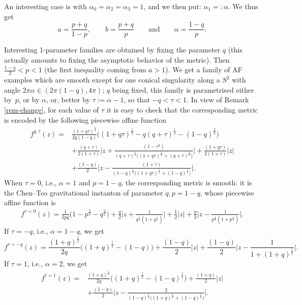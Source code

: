 \documentclass[pdftex]{sigma}
\numberwithin{equation}{section}
\begin{document}
 \begin{pc} \label{pc-AF2} An interesting case is with $\alpha _0 = \alpha_2 = \alpha _3 = 1$, and we then put: $\alpha _1 =: \alpha$. We thus get
 \[ a = \frac{p + q}{1 - p}, \qquad b = \frac{p + q}{p} \qquad \text{and}\qquad \alpha = \frac{1 - q}{p}. \]

 Interesting 1-parameter families are obtained by fixing the parameter $q$ (this actually amounts to fixing the asymptotic behavior of the metric). Then $\frac{1-q}2<p<1$ (the first inequality coming from $a>1$). We get a family of AF examples which are smooth except for one conical singularity along a $S^2$ with angle $2\pi\alpha\in(2\pi(1-q),4\pi)$; $q$ being fixed, this family is parametrised either by~$p$, or by $\alpha$, or, better by $\tau := \alpha - 1$, so that $- q < \tau < 1$. In view of Remark \ref{rem-change}, for each value of $\tau$ it is easy to check that the corresponding metric is encoded by the following piecewise affine function
 \begin{align*} f ^{q, \tau} (z) ={} & \frac{(1 + q \tau)^{\frac{1}{2}}}{2 q (1 - q)} \big((1 + q \tau)^{\frac{1}{2}} - q (q + \tau)^{\frac{1}{2}} - (1 - q) ^{\frac{3}{2}}\big) \\ & + \frac{(q + \tau)}{2 (1 + \tau)} \bigg|z + \frac{(1 - \tau ^2)}{(q + \tau) ^{\frac{1}{2}} \big((1 + q \tau) ^{\frac{1}{2}} + (q + \tau)^{\frac{1}{2}}\big)}\bigg| + \frac{(1 + q \tau)}{2 (1 + \tau)} |z| \\ & + \frac{(1 - q)}{2} \bigg\vert z - \frac{(1 + \tau)}{(1 - q) ^{\frac{1}{2}} \big((1 + q \tau)^{\frac{1}{2}} + (1 - q)^{\frac{1}{2}}\big)}\bigg\vert.
\end{align*}
 When $\tau = 0$, i.e., $\alpha = 1$ and $p = 1 - q$, the corresponding metric is smooth: it is the Chen--Teo gravitational instanton of parameter $q, p = 1 - q$, whose piecewise affine function is
 \begin{gather*} f ^{\tau = 0} (z) = \frac{1}{2 p q} \big(1 - p ^{\frac{3}{2}} - q ^{\frac{3}{2}}\big) + \frac{q}{2} \bigg|z + \frac{1}{q ^{\frac{1}{2}} (1 + q ^{\frac{1}{2}})}\bigg| + \frac{1}{2} |z| + \frac{p}{2} \bigg|z - \frac{1}{p ^{\frac{1}{2}} (1 + p ^{\frac{1}{2}})}\bigg|. \end{gather*}
 If $\tau = -q$, i.e., $\alpha = 1 - q$, we get
 \[ f ^{\tau = - q} (z) = \frac{(1 + q)^{\frac{1}{2}}}{2 q} \big((1 + q) ^{\frac{1}{2}} - (1 - q)\big) + \frac{(1 - q)}{2} |z|
 + \frac{(1 - q)}{2} \bigg|z - \frac{1}{1 + (1 + q) ^{\frac{1}{2}}}\bigg|. \]
 If $\tau = 1$, i.e., $\alpha = 2$, we get
 \begin{align*} f^{\tau = 1} (z) ={} & \frac{(1 + q) ^{\frac{1}{2}}}{2 q} \big((1 + q) ^{\frac{1}{2}} - (1 - q)^{\frac{1}{2}}\big) + \frac{(1 + q)}{2} \vert z\vert \\ & + \frac{(1 - q)}{2} \bigg\vert z - \frac{2}{(1 - q) ^{\frac{1}{2}} \big((1 + q) ^{\frac{1}{2}} + (1 - q)^{\frac{1}{2}}\big)}\bigg\vert.

\end{align*}
\end{pc}
\end{document}
